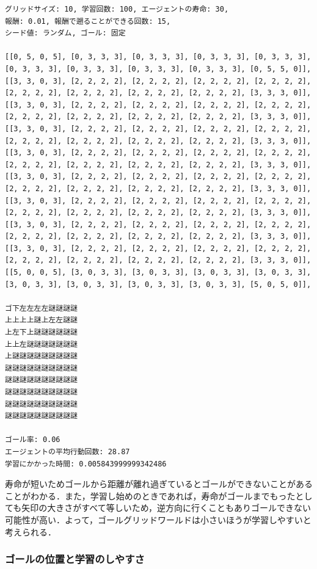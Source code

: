 \documentclass[a4j,11pt]{jarticle}
\begin{document}
\newpage

\begin{verbatim}
グリッドサイズ: 10, 学習回数: 100, エージェントの寿命: 30,
報酬: 0.01, 報酬で遡ることができる回数: 15,
シード値: ランダム, ゴール: 固定

[[0, 5, 0, 5], [0, 3, 3, 3], [0, 3, 3, 3], [0, 3, 3, 3], [0, 3, 3, 3], [0, 3, 3, 3], [0, 3, 3, 3], [0, 3, 3, 3], [0, 3, 3, 3], [0, 5, 5, 0]],
[[3, 3, 0, 3], [2, 2, 2, 2], [2, 2, 2, 2], [2, 2, 2, 2], [2, 2, 2, 2], [2, 2, 2, 2], [2, 2, 2, 2], [2, 2, 2, 2], [2, 2, 2, 2], [3, 3, 3, 0]],
[[3, 3, 0, 3], [2, 2, 2, 2], [2, 2, 2, 2], [2, 2, 2, 2], [2, 2, 2, 2], [2, 2, 2, 2], [2, 2, 2, 2], [2, 2, 2, 2], [2, 2, 2, 2], [3, 3, 3, 0]],
[[3, 3, 0, 3], [2, 2, 2, 2], [2, 2, 2, 2], [2, 2, 2, 2], [2, 2, 2, 2], [2, 2, 2, 2], [2, 2, 2, 2], [2, 2, 2, 2], [2, 2, 2, 2], [3, 3, 3, 0]],
[[3, 3, 0, 3], [2, 2, 2, 2], [2, 2, 2, 2], [2, 2, 2, 2], [2, 2, 2, 2], [2, 2, 2, 2], [2, 2, 2, 2], [2, 2, 2, 2], [2, 2, 2, 2], [3, 3, 3, 0]],
[[3, 3, 0, 3], [2, 2, 2, 2], [2, 2, 2, 2], [2, 2, 2, 2], [2, 2, 2, 2], [2, 2, 2, 2], [2, 2, 2, 2], [2, 2, 2, 2], [2, 2, 2, 2], [3, 3, 3, 0]],
[[3, 3, 0, 3], [2, 2, 2, 2], [2, 2, 2, 2], [2, 2, 2, 2], [2, 2, 2, 2], [2, 2, 2, 2], [2, 2, 2, 2], [2, 2, 2, 2], [2, 2, 2, 2], [3, 3, 3, 0]],
[[3, 3, 0, 3], [2, 2, 2, 2], [2, 2, 2, 2], [2, 2, 2, 2], [2, 2, 2, 2], [2, 2, 2, 2], [2, 2, 2, 2], [2, 2, 2, 2], [2, 2, 2, 2], [3, 3, 3, 0]],
[[3, 3, 0, 3], [2, 2, 2, 2], [2, 2, 2, 2], [2, 2, 2, 2], [2, 2, 2, 2], [2, 2, 2, 2], [2, 2, 2, 2], [2, 2, 2, 2], [2, 2, 2, 2], [3, 3, 3, 0]],
[[5, 0, 0, 5], [3, 0, 3, 3], [3, 0, 3, 3], [3, 0, 3, 3], [3, 0, 3, 3], [3, 0, 3, 3], [3, 0, 3, 3], [3, 0, 3, 3], [3, 0, 3, 3], [5, 0, 5, 0]],

ゴ下左左左左謎謎謎謎
上上上上謎上左左謎謎
上左下上謎謎謎謎謎謎
上上左謎謎謎謎謎謎謎
上謎謎謎謎謎謎謎謎謎
謎謎謎謎謎謎謎謎謎謎
謎謎謎謎謎謎謎謎謎謎
謎謎謎謎謎謎謎謎謎謎
謎謎謎謎謎謎謎謎謎謎
謎謎謎謎謎謎謎謎謎謎

ゴール率: 0.06
エージェントの平均行動回数: 28.87
学習にかかった時間: 0.005843999999342486
\end{verbatim}

寿命が短いためゴールから距離が離れ過ぎているとゴールができないことがあることがわかる．また，学習し始めのときであれば，寿命がゴールまでもったとしても矢印の大きさがすべて等しいため，逆方向に行くこともありゴールできない可能性が高い．よって，ゴールグリッドワールドは小さいほうが学習しやすいと考えられる．

\newpage

\subsubsection{ゴールの位置と学習のしやすさ}
\end{document}
